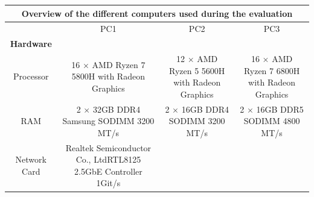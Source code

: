 \begin{table}[H]
    \centering
\begin{tabular}{ |c|c|c|c| }
\hline
\multicolumn{4}{|c|}{Overview of the different computers used during the evaluation} \\
\hline
& PC1 & PC2 & PC3  \\
\hline
\hline
\textbf{Hardware} &  &  & \\\hline
    Processor &
        \begin{minipage}{3.7cm}
	       \vspace{8pt}
		      16 $\times$ AMD Ryzen 7 5800H with Radeon Graphics
	       \vspace{8pt}
	    \end{minipage} & 
        \begin{minipage}{3.7cm}
    	    \vspace{8pt}
    		   12 $\times$ AMD Ryzen 5 5600H with Radeon Graphics
    	    \vspace{8pt}
	    \end{minipage} & 
        \begin{minipage}{3.7cm}
	       \vspace{8pt}
		      16 $\times$ AMD Ryzen 7 6800H with Radeon Graphics
	       \vspace{8pt}
	    \end{minipage} \\\hline
    RAM &
        \begin{minipage}{3.7cm}
	       \vspace{8pt}
		      2 $\times$ 32GB DDR4 Samsung SODIMM 3200 MT/s
	       \vspace{8pt}
	    \end{minipage} & 
        \begin{minipage}{3.7cm}
    	    \vspace{8pt}
    		   2 $\times$ 16GB DDR4 SODIMM 3200 MT/s
    	    \vspace{8pt}
	    \end{minipage} & 
        \begin{minipage}{3.7cm}
	       \vspace{8pt}
		      2 $\times$ 16GB DDR5 SODIMM 4800 MT/s
	       \vspace{8pt}
	    \end{minipage} \\\hline
    Network Card &
        \begin{minipage}{3.7cm}
	       \vspace{8pt}
		      Realtek Semiconductor Co., LtdRTL8125 2.5GbE Controller 1Git/s

\end{minipage}
\end{tabular}
\end{table}
